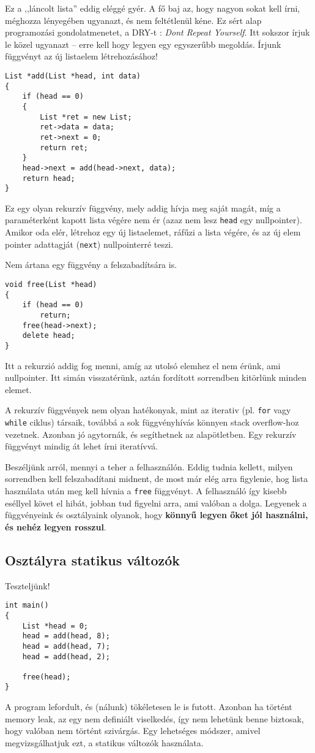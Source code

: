 \documentclass[a4paper,11.5pt,table]{article}
\begin{document}
	Ez a ,,láncolt lista'' eddig eléggé gyér. A fő baj az, hogy nagyon sokat kell írni, méghozza lényegében ugyanazt, és nem feltétlenül kéne. Ez sért alap programozási gondolatmenetet, a DRY-t : \textit{Dont Repeat Yourself}. Itt sokszor írjuk le közel ugyanazt -- erre kell hogy legyen egy egyszerűbb megoldás. Írjunk függvényt az új listaelem létrehozásához!
	\begin{lstlisting}
List *add(List *head, int data)
{
	if (head == 0)
	{
		List *ret = new List;
		ret->data = data;
		ret->next = 0;
		return ret;
	}
	head->next = add(head->next, data);
	return head;
}
	\end{lstlisting}
	Ez egy olyan rekurzív függvény, mely addig hívja meg saját magát, míg a paraméterként kapott lista végére nem ér (azaz nem lesz \texttt{head} egy nullpointer). Amikor oda elér, létrehoz egy új listaelemet, ráfűzi a lista végére, és az új elem pointer adattagját (\texttt{next}) nullpointerré teszi.
	\medskip
	
	Nem ártana egy függvény a felszabadítsára is.
	\begin{lstlisting}
void free(List *head)
{
	if (head == 0)
		return;
	free(head->next);
	delete head;
}
	\end{lstlisting}
	Itt a rekurzió addig fog menni, amíg az utolsó elemhez el nem érünk, ami nullpointer. Itt simán visszatérünk, aztán fordított sorrendben kitörlünk minden elemet.
	\begin{note}
		A rekurzív függvények nem olyan hatékonyak, mint az iterativ (pl. \texttt{for} vagy \texttt{while} ciklus) társaik, továbbá a sok függvényhívás könnyen stack overflow-hoz vezetnek. Azonban jó agytornák, és segíthetnek az alapötletben. Egy rekurzív függvényt mindig át lehet írni iteratívvá.
	\end{note}
	Beszéljünk arról, mennyi a teher a felhasználón. Eddig tudnia kellett, milyen sorrendben kell felszabadítani midnent, de most már elég arra figylenie, hog lista használata után meg kell hívnia a \texttt{free} függvényt. A felhasználó így kisebb eséllyel követ el hibát, jobban tud figyelni arra, ami valóban a dolga. Legyenek a függvényeink és osztályaink olyanok, hogy \textbf{könnyű legyen őket jól használni, és nehéz legyen rosszul}.
	
	\subsection{Osztályra statikus változók}
	Teszteljünk!
	\begin{lstlisting}
int main()
{
	List *head = 0;
	head = add(head, 8);
	head = add(head, 7);
	head = add(head, 2);
	
	free(head);
}
	\end{lstlisting}
	A program lefordult, és (nálunk) tökéletesen le is futott. Azonban ha történt memory leak, az egy nem definiált viselkedés, így nem lehetünk benne biztosak, hogy valóban nem történt szivárgás. Egy lehetséges módszer, amivel megvizsgálhatjuk ezt, a statikus változók használata.
	
\end{document}
